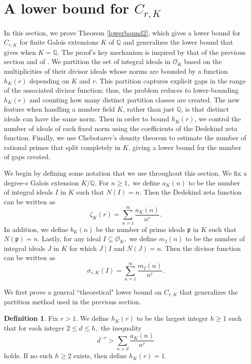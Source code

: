 \documentclass[12pt]{amsart}
\theoremstyle{definition}
\newtheorem{definition}[theorem]{Definition}
\numberwithin{equation}{section}
\newcommand{\Q}{\mathbb{Q}}
\begin{document}
\section{A lower bound for $C_{r,K}$} \label{section-lower-2}



In this section, we prove Theorem \ref{lowerbound2}, which gives a lower bound for $C_{r,K}$ for finite Galois extensions $K$ of $\Q$ and generalizes the lower bound that \cite[Theorem 4.1]{AB19} gives when $K = \Q$. The proof's key mechanism is inspired by that of the previous section and of \cite[Theorem 4.1]{AB19}. We partition the set of integral ideals in \(\mathcal O_K\)
based on the multiplicities of their divisor ideals whose norms are bounded by a
function \(h_K(r)\) depending on \(K\) and \(r\). This partition captures explicit
gaps in the range of the associated divisor function; thus, the problem reduces to
lower-bounding \(h_K(r)\) and counting how many distinct partition classes are
created.
The new feature when handling a number field \(K\), rather than just \(\mathbb Q\),
is that distinct ideals can have the same norm. Then in order to bound
\(h_K(r)\), we control the number of ideals of each fixed norm using the
coefficients of the Dedekind zeta function. Finally, we use Chebotarev's density
theorem to estimate the number of rational primes that split completely in \(K\), giving a 
lower bound for the number of gaps created.

 We begin by defining some notation that we use throughout this section. We fix a degree-$s$ Galois extension $K/ \Q. $ 
For $n \geq 1,$ we define $a_K(n)$ to be the number of integral ideals $I$ in $K$ such that $N(I) = n.$ Then the Dedekind zeta function can be written as $$\zeta_K(r) = \sum_{n=1}^\infty \frac{a_K(n)}{n^r}.$$ In addition, we define $b_K(n)$ be the number of prime ideals $\mathfrak p$ in $K$ such that $N(\mathfrak p) = n.$ Lastly, for any ideal $I \subseteq \mathcal O_K,$ we define $m_I(n)$ to be the number of integral ideals $J$ in $K$ for which $J \mid I$ and $N(J) = n$. Then the divisor function can be written as $$\sigma_{r,K}(I) = \sum_{n=1}^\infty \frac{m_I(n)}{n^r}.$$

We first prove a general ``theoretical" lower bound on $C_{r,K}$ that generalizes the partition method used in the previous section. 

\begin{definition}
    Fix $r > 1.$ We define $h_K(r)$ to be the largest integer $h \geq 1$ such that for each integer $2 \leq d \leq h,$ the inequality $$d^{-r} > \sum_{n > d} \frac{a_K(n)}{n^r}$$ holds. If no such $h \geq 2$ exists, then define $h_K(r) = 1.$
\end{definition}
\end{document}
